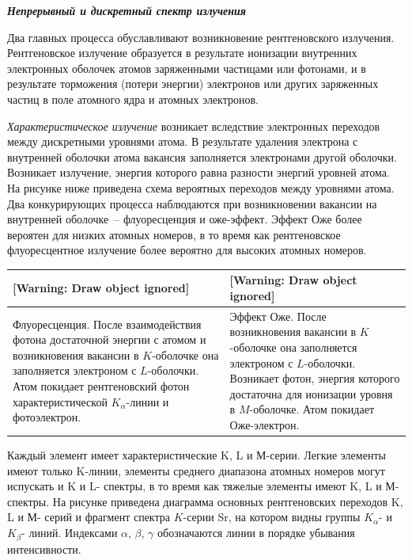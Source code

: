 \documentclass[a4paper,14pt, openany, twoside, draft]{extbook} %
\begin{document}
\emph{\textbf{Непрерывный и дискретный спектр излучения}}

Два главных процесса обуславливают возникновение рентгеновского излучения.  Рентгеновское излучение образуется в результате ионизации внутренних электронных оболочек атомов заряженными частицами или фотонами, и в результате торможения (потери энергии) электронов или других заряженных частиц в поле атомного ядра и атомных электронов.

\emph{Характеристическое излучение} возникает вследствие электронных переходов между дискретными уровнями атома.  В результате удаления электрона с внутренней оболочки атома вакансия заполняется электронами другой оболочки.  Возникает излучение, энергия которого равна разности энергий уровней атома.  На рисунке ниже приведена схема вероятных переходов между уровнями атома.  Два конкурирующих процесса наблюдаются при возникновении вакансии на внутренней оболочке~-- флуоресценция и оже-эффект.  Эффект Оже более вероятен для низких атомных номеров, в то время как рентгеновское флуоресцентное излучение более вероятно для высоких атомных номеров.

\begin{flushleft}
\tablefirsthead{}
\tablehead{}
\tabletail{}
\tablelasttail{}
\begin{supertabular}{|m{6.866cm}|m{8.0130005cm}|}
\hline
{ [Warning: Draw object ignored]} &
{ [Warning: Draw object ignored]}\\\hline
{ Флуоресценция.  После взаимодействия фотона достаточной энергии с атомом и возникновения вакансии в ${K}$-оболочке она заполняется электроном с ${L}$-оболочки.  Атом покидает рентгеновский фотон характеристической $K_{\alpha}$-линии и фотоэлектрон.} &
{ Эффект Оже.  После возникновения вакансии в $K$-оболочке она заполняется электроном с $L$-оболочки.  Возникает фотон, энергия которого достаточна для ионизации уровня в $M$-оболочке.  Атом покидает Оже-электрон.}\\\hline
\end{supertabular}
\end{flushleft}
Каждый элемент имеет характеристические K, L и М-серии.  Легкие элементы имеют только K-линии, элементы среднего  диапазона атомных номеров могут испускать и K и L- спектры, в то время как тяжелые элементы имеют K, L и М- спектры.  На рисунке приведена диаграмма основных рентгеновских переходов K, L и М- серий и фрагмент спектра $K$-серии Sr, на котором видны группы $K_{\alpha}$- и $K_{\beta}$- линий.  Индексами ${\alpha}$, ${\beta}$, ${\gamma}$ обозначаются линии в порядке убывания интенсивности.
\end{document}
